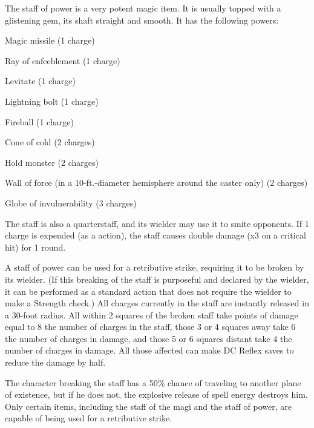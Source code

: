 
 The staff of power is a very potent magic item. It is usually topped with a glistening gem, its shaft straight and smooth. It has the following powers:
\begin{itemize*}
\item Magic missile (1 charge)
\item Ray of enfeeblement (1 charge)
\item Levitate (1 charge)
\item Lightning bolt (1 charge)
\item Fireball (1 charge)
\item Cone of cold (2 charges)
\item Hold monster (2 charges)
\item Wall of force (in a 10-ft.-diameter hemisphere around the caster only) (2 charges)
\item Globe of invulnerability (3 charges)
\end{itemize*}

The staff is also a  quarterstaff, and its wielder may use it to smite opponents. If 1 charge is expended (as a  action), the staff causes double damage (x3 on a critical hit) for 1 round.

A staff of power can be used for a retributive strike, requiring it to be broken by its wielder. (If this breaking of the staff is purposeful and declared by the wielder, it can be performed as a standard action that does not require the wielder to make a Strength check.) All charges currently in the staff are instantly released in a 30-foot radius. All within 2 squares of the broken staff take points of damage equal to 8 \mtimes the number of charges in the staff, those 3 or 4 squares away take 6 \mtimes the number of charges in damage, and those 5 or 6 squares distant take 4 \mtimes the number of charges in damage. All those affected can make DC  Reflex saves to reduce the damage by half.

The character breaking the staff has a 50\% chance of traveling to another plane of existence, but if he does not, the explosive release of spell energy destroys him. Only certain items, including the staff of the magi and the staff of power, are capable of being used for a retributive strike.

